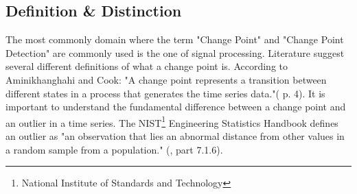 \documentclass[	runningheads,
				a4paper]{llncs}
\begin{document}
	\subsection{Definition \& Distinction}
	\label{ssec:cp_distinction}
	The most commonly domain where the term "Change Point" and "Change Point Detection" are commonly used is the one of signal processing. Literature suggest several different definitions of what a change point is.  According to Aminikhanghahi and Cook: "A change point represents a transition between different states in a process that generates the time series data."(\cite{Samaneh2016} p. 4). It is important to understand the fundamental difference between a change point and an outlier in a time series. The NIST\footnote{National Institute of Standards and Technology} Engineering Statistics Handbook defines an outlier as "an observation that lies an abnormal distance from other values in a random sample from a population." (\cite{nist}, part 7.1.6). 
\end{document}
